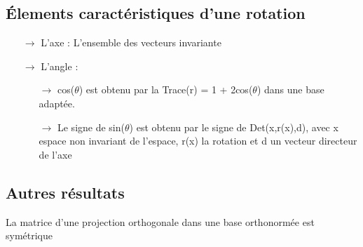\subsection{Élements caractéristiques d'une rotation}
\begin{itemize}
 \item[$\rightarrow$] L'axe : L'ensemble des vecteurs invariante
 \item[$\rightarrow$] L'angle : 
 \begin{itemize}
 \item[$\rightarrow$] cos($\theta$) est obtenu par la Trace(r) = 1 + 2cos($\theta$) dans une base adaptée.
 \item[$\rightarrow$] Le signe de sin($\theta$) est obtenu par le signe de Det(x,r(x),d), avec x espace non invariant de l'espace, r(x) la rotation et d un vecteur directeur de l'axe
\end{itemize}
\end{itemize}
\subsection{Autres résultats}
\begin{prop}
La matrice d'une projection orthogonale dans une base orthonormée est symétrique
\end{prop}
